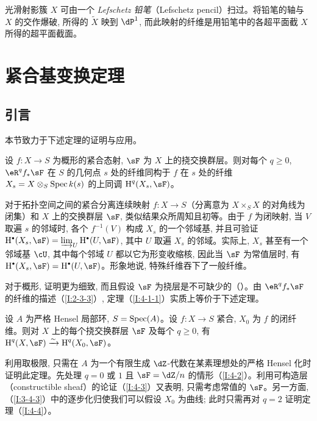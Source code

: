 \subsubsection{}\label{I:3-4-4}

光滑射影簇 $X$ 可由一个 \emph{Lefschetz 铅笔}（Lefschetz pencil）扫过。将铅笔的轴与 $X$ 的交作爆破, 所得的 $\widetilde X$ 映到 $\dP^1$, 而此映射的纤维是用铅笔中的各超平面截 $X$ 所得的超平面截面。

\section{紧合基变换定理}\label{I:4}

\subsection{引言}\label{I:4-1}

本节致力于下述定理的证明与应用。

\begin{theorem}\label{I:4-1-1}
设 $f:X\to S$ 为概形的紧合态射, $\sF$ 为 $X$ 上的挠交换群层。则对每个 $q\geqslant0$, $\eR^qf_*\sF$ 在 $S$ 的几何点 $s$ 处的纤维同构于 $f$ 在 $s$ 处的纤维 $X_s=X\otimes_S\operatorname{Spec} k(s)$ 的上同调 $\h^q(X_s,\sF)$。
\end{theorem}

对于拓扑空间之间的紧合分离连续映射 $f:X\to S$（分离意为 $X\times_SX$ 的对角线为闭集）和 $X$ 上的交换群层 $\sF$, 类似结果众所周知且初等。由于 $f$ 为闭映射, 当 $V$ 取遍 $s$ 的邻域时, 各个 $f^{-1}(V)$ 构成 $X_s$ 的一个邻域基, 并且可验证 $\h^\bullet(X_s,\sF)=\varinjlim_U\h^\bullet(U,\sF)$, 其中 $U$ 取遍 $X_s$ 的邻域。实际上, $X_s$ 甚至有一个邻域基 $\cU$, 其中每个邻域 $U$ 都以它为形变收缩核, 因此当 $\sF$ 为常值层时, 有 $\h^\bullet(X_s,\sF)=\h^\bullet(U,\sF)$。形象地说, 特殊纤维吞下了一般纤维。

对于概形, 证明更为细致, 而且假设 $\sF$ 为挠层是不可缺少的（\cite[XII.2]{sga4}）。由 $\eR^qf_*\sF$ 的纤维的描述（\ref{I:2-3-3}）, 定理（\ref{I:4-1-1}）实质上等价于下述定理。

\begin{theorem}\label{I:4-1-2}
设 $A$ 为严格 Hensel 局部环, $S=\operatorname{Spec}(A)$。设 $f:X\to S$ 紧合, $X_0$ 为 $f$ 的闭纤维。则对 $X$ 上的每个挠交换群层 $\sF$ 及每个 $q\geqslant0$, 有 $\h^q(X,\sF)\iso\h^q(X_0,\sF)$。
\end{theorem}

利用取极限, 只需在 $A$ 为一个有限生成 $\dZ$-代数在某素理想处的严格 Hensel 化时证明此定理。先处理 $q=0$ 或 $1$ 且 $\sF=\dZ/n$ 的情形（\ref{I:4-2}）。利用可构造层（constructible sheaf）的论证（\ref{I:4-3}）又表明, 只需考虑常值的 $\sF$。另一方面, （\ref{I:3-4-3}）中的逐步化归使我们可以假设 $X_0$ 为曲线; 此时只需再对 $q=2$ 证明定理（\ref{I:4-4}）。

